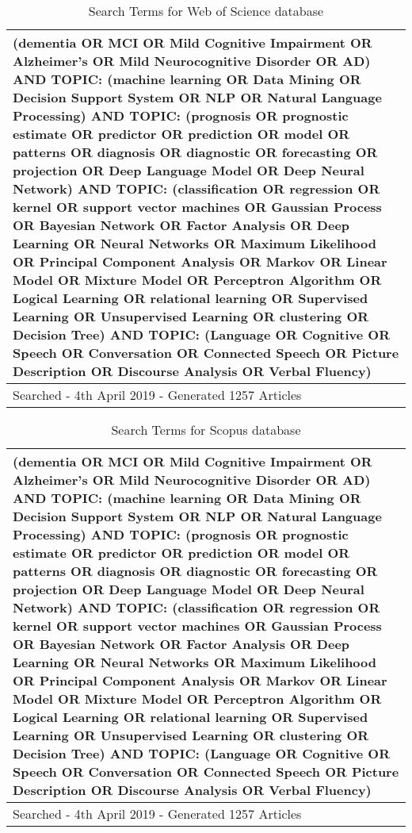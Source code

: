 \documentclass[12pt]{article}
\begin{document}
\begin{table}
	\begin{tabular}{ p{12cm} }
	\hline
	(dementia OR MCI OR Mild Cognitive Impairment OR Alzheimer's OR Mild Neurocognitive Disorder OR AD) AND TOPIC: (machine learning OR Data Mining OR Decision Support System OR NLP OR Natural 			Language Processing) AND TOPIC: (prognosis OR prognostic estimate OR predictor OR prediction OR model OR patterns OR diagnosis OR diagnostic OR forecasting OR projection OR Deep Language Model 		OR Deep Neural Network) AND TOPIC: (classification OR regression OR kernel OR support vector machines OR Gaussian Process OR Bayesian Network OR Factor Analysis OR Deep Learning OR Neural 			Networks OR Maximum Likelihood OR Principal Component Analysis OR Markov OR Linear Model OR Mixture Model OR Perceptron Algorithm OR Logical Learning OR relational learning OR Supervised 				Learning OR Unsupervised Learning OR clustering OR Decision Tree) AND TOPIC: (Language OR Cognitive OR Speech OR Conversation OR Connected Speech OR Picture Description OR Discourse Analysis OR 		Verbal Fluency)  \\ \hline
	Searched - 4th April 2019 - Generated 1257 Articles \\
	\hline
	\end{tabular}
	\caption[Table caption text]{Search Terms for Web of Science database}
	\label{table:name}
\end{table}

\begin{table}
	\begin{tabular}{ p{12cm} }
	\hline
	(dementia OR MCI OR Mild Cognitive Impairment OR Alzheimer's OR Mild Neurocognitive Disorder OR AD) AND TOPIC: (machine learning OR Data Mining OR Decision Support System OR NLP OR Natural 			Language Processing) AND TOPIC: (prognosis OR prognostic estimate OR predictor OR prediction OR model OR patterns OR diagnosis OR diagnostic OR forecasting OR projection OR Deep Language Model 		OR Deep Neural Network) AND TOPIC: (classification OR regression OR kernel OR support vector machines OR Gaussian Process OR Bayesian Network OR Factor Analysis OR Deep Learning OR Neural 			Networks OR Maximum Likelihood OR Principal Component Analysis OR Markov OR Linear Model OR Mixture Model OR Perceptron Algorithm OR Logical Learning OR relational learning OR Supervised 				Learning OR Unsupervised Learning OR clustering OR Decision Tree) AND TOPIC: (Language OR Cognitive OR Speech OR Conversation OR Connected Speech OR Picture Description OR Discourse Analysis OR 		Verbal Fluency)  \\ \hline
	Searched - 4th April 2019 - Generated 1257 Articles \\
	\hline
	\end{tabular}
	\caption[Table caption text]{Search Terms for Scopus database}
	\label{table:name}
\end{table}
\end{document}
